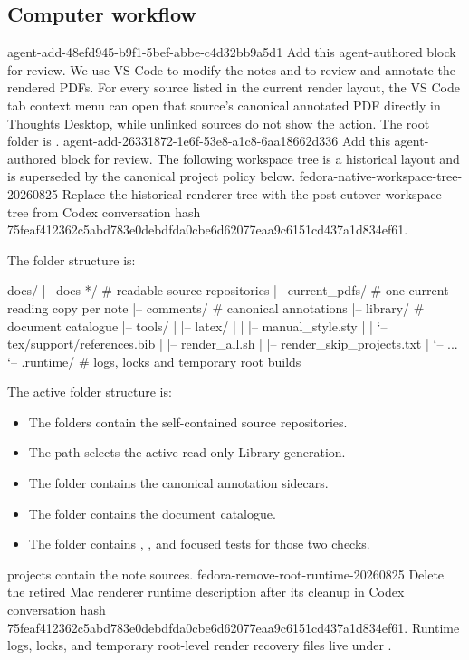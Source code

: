 \subsection*{Computer workflow}
\agentProposedEdit
  {agent-add-48efd945-b9f1-5bef-abbe-c4d32bb9a5d1}
  {Add this agent-authored block for review.}
  {}
  {We use VS Code to modify the  notes and  to review and annotate the rendered PDFs.
For every source listed in the current render layout, the VS Code tab context menu can open that source's canonical annotated PDF directly in Thoughts Desktop, while unlinked sources do not show the action.}
The root folder is .
\agentProposedEdit
  {agent-add-26331872-1e6f-53e8-a1c8-6aa18662d336}
  {Add this agent-authored block for review.}
  {}
  {The following workspace tree is a historical layout and is superseded by the canonical project policy below.}
\agentProposedEdit
  {fedora-native-workspace-tree-20260825}
  {Replace the historical renderer tree with the post-cutover workspace tree from Codex conversation hash 75feaf412362c5abd783e0debdfda0cbe6d62077eaa9c6151cd437a1d834ef61.}
  {The folder structure is:
\begin{DocCode}
  docs/
  |-- docs-*/                 # readable source repositories
  |-- current_pdfs/           # one current reading copy per note
  |-- comments/               # canonical annotations
  |-- library/                # document catalogue
  |-- tools/
  |   |-- latex/
  |   |   |-- manual_style.sty
  |   |   `-- tex/support/references.bib
  |   |-- render_all.sh
  |   |-- render_skip_projects.txt
  |   `-- ...
  `-- .runtime/               # logs, locks and temporary root builds
\end{DocCode}}
  {The active folder structure is:
\begin{itemize}
\item The  folders contain the self-contained source repositories.
\item The  path selects the active read-only Library generation.
\item The  folder contains the canonical annotation sidecars.
\item The  folder contains the document catalogue.
\item The  folder contains , , and focused tests for those two checks.
\end{itemize}}
 projects contain the note sources.
\agentProposedEdit
  {fedora-remove-root-runtime-20260825}
  {Delete the retired Mac renderer runtime description after its cleanup in Codex conversation hash 75feaf412362c5abd783e0debdfda0cbe6d62077eaa9c6151cd437a1d834ef61.}
  {Runtime logs, locks, and temporary root-level render recovery files live under .}
  {}


